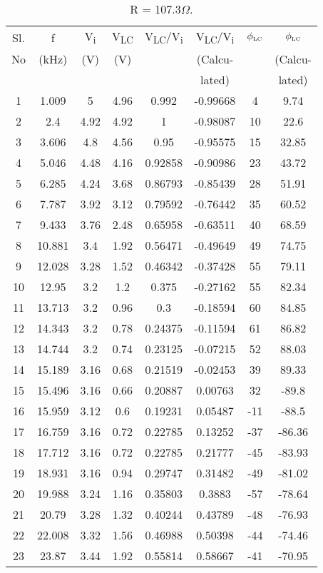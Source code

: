 \documentclass[a4paper]{article}
\begin{document}
\begin{table}[H]
  \begin{center}
    \caption{R = 107.3$\Omega$.}
    \label{tab:table1}
\resizebox{9.2cm}{!} {
   \begin{tabular}{|c|c|c|c|c|c|c|c|}
   \hline
Sl. & f & V\textsubscript{\tiny i} & V\textsubscript{\tiny LC} &  V\textsubscript{\tiny LC}/V\textsubscript{\tiny i} & V\textsubscript{\tiny LC}/V\textsubscript{\tiny i} & $\phi\textsubscript{\tiny LC}$ & $\phi\textsubscript{\tiny LC}$\\
No & (kHz) & (V) &(V) &  & (Calcu- & & (Calcu- \\
 &  &  & &  & lated) & & lated) \\
\hline
1  & 1.009  & 5    & 4.96 & 0.992   & -0.99668 & 4   & 9.74   \\
2  & 2.4    & 4.92 & 4.92 & 1       & -0.98087 & 10  & 22.6   \\
3  & 3.606  & 4.8  & 4.56 & 0.95    & -0.95575 & 15  & 32.85  \\
4  & 5.046  & 4.48 & 4.16 & 0.92858 & -0.90986 & 23  & 43.72  \\
5  & 6.285  & 4.24 & 3.68 & 0.86793 & -0.85439 & 28  & 51.91  \\
6  & 7.787  & 3.92 & 3.12 & 0.79592 & -0.76442 & 35  & 60.52  \\
7  & 9.433  & 3.76 & 2.48 & 0.65958 & -0.63511 & 40  & 68.59  \\
8  & 10.881 & 3.4  & 1.92 & 0.56471 & -0.49649 & 49  & 74.75  \\
9  & 12.028 & 3.28 & 1.52 & 0.46342 & -0.37428 & 55  & 79.11  \\
10 & 12.95  & 3.2  & 1.2  & 0.375   & -0.27162 & 55  & 82.34  \\
11 & 13.713 & 3.2  & 0.96 & 0.3     & -0.18594 & 60  & 84.85  \\
12 & 14.343 & 3.2  & 0.78 & 0.24375 & -0.11594 & 61  & 86.82  \\
13 & 14.744 & 3.2  & 0.74 & 0.23125 & -0.07215 & 52  & 88.03  \\
14 & 15.189 & 3.16 & 0.68 & 0.21519 & -0.02453 & 39  & 89.33  \\
15 & 15.496 & 3.16 & 0.66 & 0.20887 & 0.00763  & 32  & -89.8  \\
16 & 15.959 & 3.12 & 0.6  & 0.19231 & 0.05487  & -11 & -88.5  \\
17 & 16.759 & 3.16 & 0.72 & 0.22785 & 0.13252  & -37 & -86.36 \\
18 & 17.712 & 3.16 & 0.72 & 0.22785 & 0.21777  & -45 & -83.93 \\
19 & 18.931 & 3.16 & 0.94 & 0.29747 & 0.31482  & -49 & -81.02 \\
20 & 19.988 & 3.24 & 1.16 & 0.35803 & 0.3883   & -57 & -78.64 \\
21 & 20.79  & 3.28 & 1.32 & 0.40244 & 0.43789  & -48 & -76.93 \\
22 & 22.008 & 3.32 & 1.56 & 0.46988 & 0.50398  & -44 & -74.46 \\
23 & 23.87  & 3.44 & 1.92 & 0.55814 & 0.58667  & -41 & -70.95   \\
\hline
\end{tabular}
    }
  \end{center}
\end{table}
\end{document}
